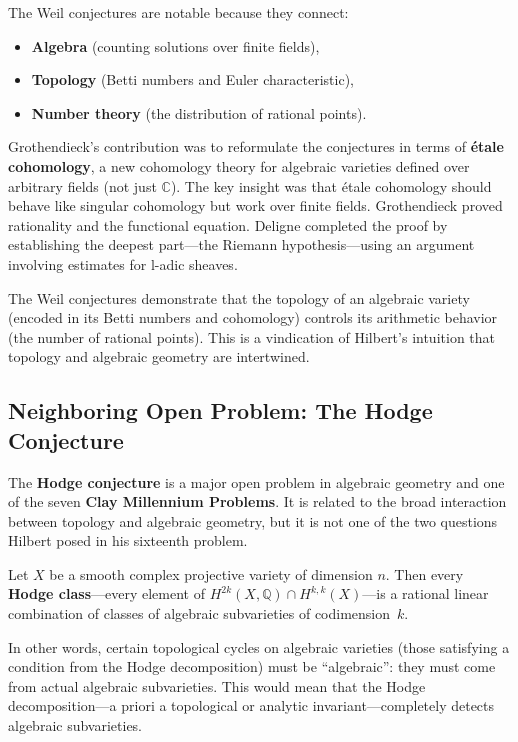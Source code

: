 The Weil conjectures are notable because they connect:
\begin{itemize}
    \item \textbf{Algebra} (counting solutions over finite fields),
    \item \textbf{Topology} (Betti numbers and Euler characteristic),
    \item \textbf{Number theory} (the distribution of rational points).
\end{itemize}

Grothendieck's contribution was to reformulate the conjectures in terms of \textbf{\'{e}tale cohomology}, a new cohomology theory for algebraic varieties defined over arbitrary fields (not just $\mathbb{C}$). The key insight was that \'etale cohomology should behave like singular cohomology but work over finite fields. Grothendieck proved rationality and the functional equation. Deligne completed the proof by establishing the deepest part---the Riemann hypothesis---using an argument involving estimates for l-adic sheaves.

The Weil conjectures demonstrate that the topology of an algebraic variety (encoded in its Betti numbers and cohomology) controls its arithmetic behavior (the number of rational points). This is a vindication of Hilbert's intuition that topology and algebraic geometry are intertwined.

\subsection{Neighboring Open Problem: The Hodge Conjecture}

The \textbf{Hodge conjecture} is a major open problem in algebraic geometry and one of the seven \textbf{Clay Millennium Problems}. It is related to the broad interaction between topology and algebraic geometry, but it is not one of the two questions Hilbert posed in his sixteenth problem.

\begin{conjecture}\label{conj:hodge}
Let $X$ be a smooth complex projective variety of dimension $n$. Then every \textbf{Hodge class}---every element of $H^{2k}(X, \mathbb{Q}) \cap H^{k,k}(X)$---is a rational linear combination of classes of algebraic subvarieties of codimension~$k$.
\end{conjecture}

In other words, certain topological cycles on algebraic varieties (those satisfying a condition from the Hodge decomposition) must be ``algebraic'': they must come from actual algebraic subvarieties. This would mean that the Hodge decomposition---a priori a topological or analytic invariant---completely detects algebraic subvarieties.

